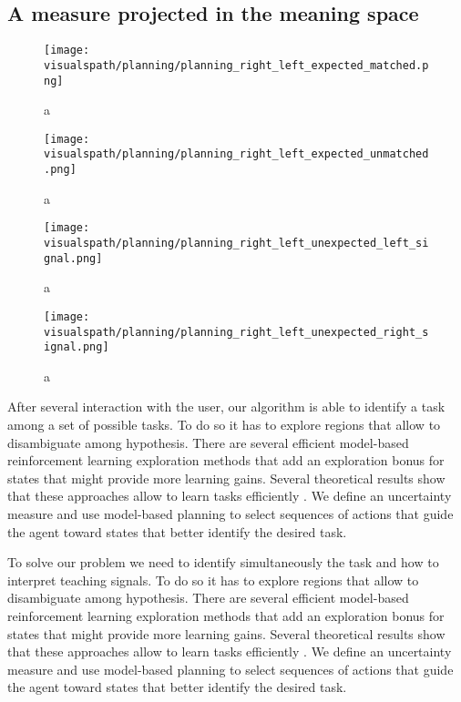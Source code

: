\subsection{A measure projected in the meaning space}

\begin{figure}[!ht]
  \centering
  \texttt{[image: \\visualspath/planning/planning\_right\_left\_expected\_matched.png]}
  \caption{a}
  \label{fig:uncertaintysmeaningupdownexpectedleft}
\end{figure}

\begin{figure}[!ht]
  \centering
  \texttt{[image: \\visualspath/planning/planning\_right\_left\_expected\_unmatched.png]}
  \caption{a}
  \label{fig:uncertaintysmeaningupdownexpectedright}
\end{figure}

\begin{figure}[!ht]
  \centering
  \texttt{[image: \\visualspath/planning/planning\_right\_left\_unexpected\_left\_signal.png]}
  \caption{a}
  \label{fig:uncertaintysmeaningupdownunexpectedleft}
\end{figure}

\begin{figure}[!ht]
  \centering
  \texttt{[image: \\visualspath/planning/planning\_right\_left\_unexpected\_right\_signal.png]}
  \caption{a}
  \label{fig:uncertaintysmeaningupdownunexpectedright}
\end{figure}

After several interaction with the user, our algorithm is able to identify a task among a set of possible tasks. To do so it has to explore regions that allow to disambiguate among hypothesis. There are several efficient model-based reinforcement learning exploration methods that add an exploration bonus for states that might provide more learning gains. Several theoretical results show that these approaches allow to learn tasks efficiently \cite{brafman2003r,kolter2009near}. We define an uncertainty measure and use model-based planning to select sequences of actions that guide the agent toward states that better identify the desired task.

To solve our problem we need to identify simultaneously the task and how to interpret teaching signals. To do so it has to explore regions that allow to disambiguate among hypothesis. There are several efficient model-based reinforcement learning exploration methods that add an exploration bonus for states that might provide more learning gains. Several theoretical results show that these approaches allow to learn tasks efficiently \cite{brafman2003r,kolter2009near}. We define an uncertainty measure and use model-based planning to select sequences of actions that guide the agent toward states that better identify the desired task.

